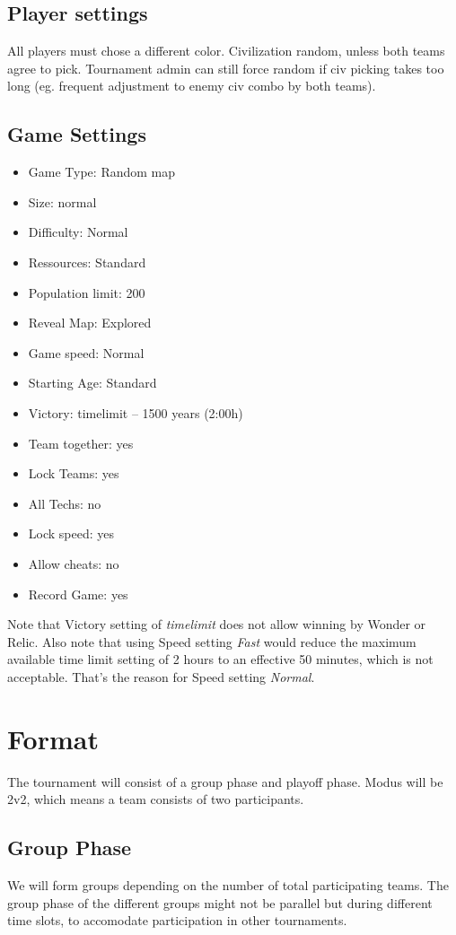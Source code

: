 \documentclass{article}
\begin{document}
\subsection{Player settings}
All players must chose a different color. Civilization random, unless both teams agree to pick. Tournament admin can still force random if civ picking takes too long (eg. frequent adjustment to enemy civ combo by both teams).

\subsection{Game Settings}
\begin{itemize}[noitemsep]
\item Game Type: Random map
\item Size: normal
\item Difficulty: Normal
\item Ressources: Standard
\item Population limit: 200
\item Reveal Map: Explored
\item Game speed: Normal
\item Starting Age: Standard
\item Victory: timelimit – 1500 years (2:00h)
\item Team together: yes
\item Lock Teams: yes
\item All Techs: no
\item Lock speed: yes
\item Allow cheats: no
\item Record Game: yes
\end{itemize}

Note that Victory setting of \textit{timelimit} does not allow winning by Wonder or Relic. Also note that using Speed setting \textit{Fast} would reduce the maximum available time limit setting of 2 hours to an effective 50 minutes, which is not acceptable. That's the reason for Speed setting \textit{Normal}.

\newpage

\section{Format}
The tournament will consist of a group phase and playoff phase. Modus will be 2v2, which means a team consists of two participants.

\subsection{Group Phase}
We will form groups depending on the number of total participating teams. The group phase of the different groups might not be parallel but during different time slots, to accomodate participation in other tournaments.
\end{document}
